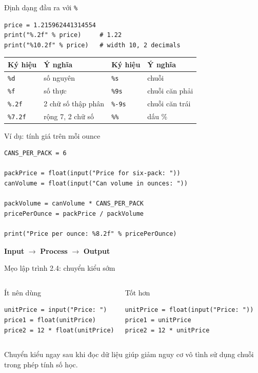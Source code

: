 \documentclass[aspectratio=169,10pt]{beamer}
\begin{document}
\begin{frame}[fragile]{Định dạng đầu ra với \texttt{\%}}
\begin{lstlisting}
price = 1.215962441314554
print("%.2f" % price)     # 1.22
print("%10.2f" % price)   # width 10, 2 decimals
\end{lstlisting}
\begin{table}
\scriptsize
\centering
\begin{tabular}{ll@{\quad}ll}
\toprule
Ký hiệu & Ý nghĩa & Ký hiệu & Ý nghĩa \\
\midrule
\texttt{\%d} & số nguyên & \texttt{\%s} & chuỗi \\
\texttt{\%f} & số thực & \texttt{\%9s} & chuỗi căn phải \\
\texttt{\%.2f} & 2 chữ số thập phân & \texttt{\%-9s} & chuỗi căn trái \\
\texttt{\%7.2f} & rộng 7, 2 chữ số & \texttt{\%\%} & dấu \% \\
\bottomrule
\end{tabular}
\end{table}
\end{frame}

\begin{frame}[fragile]{Ví dụ: tính giá trên mỗi ounce}
\begin{lstlisting}
CANS_PER_PACK = 6

packPrice = float(input("Price for six-pack: "))
canVolume = float(input("Can volume in ounces: "))

packVolume = canVolume * CANS_PER_PACK
pricePerOunce = packPrice / packVolume

print("Price per ounce: %8.2f" % pricePerOunce)
\end{lstlisting}
\begin{center}
\textbf{Input} $\rightarrow$ \textbf{Process} $\rightarrow$ \textbf{Output}
\end{center}
\end{frame}

\begin{frame}[fragile]{Mẹo lập trình 2.4: chuyển kiểu sớm}
\begin{columns}[T,onlytextwidth]
\begin{alertblock}{Ít nên dùng}
\begin{lstlisting}
unitPrice = input("Price: ")
price1 = float(unitPrice)
price2 = 12 * float(unitPrice)
\end{lstlisting}
\end{alertblock}
\begin{block}{Tốt hơn}
\begin{lstlisting}
unitPrice = float(input("Price: "))
price1 = unitPrice
price2 = 12 * unitPrice
\end{lstlisting}
\end{block}
\end{columns}
\vspace{0.15cm}
Chuyển kiểu ngay sau khi đọc dữ liệu giúp giảm nguy cơ vô tình sử dụng chuỗi trong phép tính số học.
\end{frame}
\end{document}
